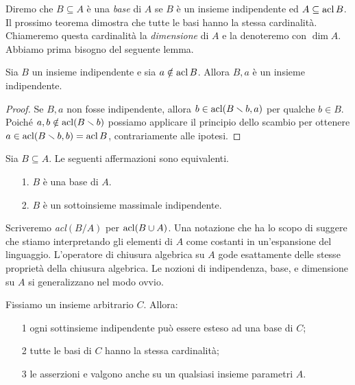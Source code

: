 Diremo che $B\subseteq A$ \`e una \emph{base\/} di $A$ se $B$ \`e un insieme indipendente ed $A\subseteq\mathop{\rm acl} B$. Il prossimo teorema dimostra che tutte le basi hanno la stessa cardinalit\`a. Chiameremo questa cardinalit\`a la \emph{dimensione\/} di $A$ e la denoteremo con \emph{$\dim A$}. Abbiamo prima bisogno del seguente lemma.

\begin{lemma}\label{indipendenza+1}
Sia $B$ un insieme indipendente e sia $a\notin \mathop{\rm acl} B$. Allora $B,a$ \`e un insieme indipendente.
\end{lemma}
\begin{proof}
Se $B,a$ non fosse indipendente, allora $b\in\mathop{\rm acl}(B\smallsetminus b,a)$ per qualche $b\in B$. Poich\'e $a,b\notin\mathop{\rm acl}(B\smallsetminus b)$ possiamo applicare il principio dello scambio per ottenere $a\in\mathop{\rm acl}(B\smallsetminus b,b)=\mathop{\rm acl} B$, contrariamente alle ipotesi.
\end{proof}

\begin{corollary}\label{basemassimale}
Sia $B\subseteq A$. Le seguenti affermazioni sono equivalenti.
\begin{itemize}
\item[1.] $B$ \`e una base di $A$.
\item[2.] $B$ \`e un sottoinsieme massimale indipendente.\QED
\end{itemize}
\end{corollary}

Scriveremo \emph{acl$(B/A)$\/} per $\mathop{\rm acl}(B\cup A)$. Una notazione che ha lo scopo di suggere che stiamo interpretando gli elementi di $A$ come costanti in un'espansione del linguaggio. L'operatore di chiusura algebrica su $A$ gode esattamente delle stesse propriet\`a della chiusura algebrica. Le nozioni di indipendenza, base, e dimensione su $A$ si generalizzano nel modo ovvio.

\begin{theorem} Fissiamo un insieme arbitrario $C$. Allora:
\begin{itemize}
\item[1] ogni sottinsieme indipendente pu\`o essere esteso ad una base di $C$;
\item[2] tutte le basi di $C$ hanno la stessa cardinalit\`a;
\item[3] le asserzioni  e  valgono anche su un qualsiasi insieme parametri $A$.
\end{itemize}
\end{theorem}

